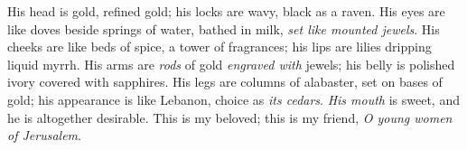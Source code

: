 \begin{biblechapter}
\verse His head is gold, refined gold; 
his locks are wavy, black as a raven.
\verse His eyes are like doves beside springs of water, 
bathed in milk, \textit{set like mounted jewels}.
\verse His cheeks are like beds of spice, a tower of fragrances; 
his lips are lilies dripping liquid myrrh.
\verse His arms are \textit{rods} of gold \textit{engraved with} jewels; 
his belly is polished ivory covered with sapphires.
\verse His legs are columns of alabaster, set on bases of gold; 
his appearance is like Lebanon, choice as \textit{its cedars}.
\verse \textit{His mouth} is sweet, 
and he is altogether desirable. 
This is my beloved; 
this is my friend, \textit{O young women of Jerusalem}.
\end{biblechapter}

